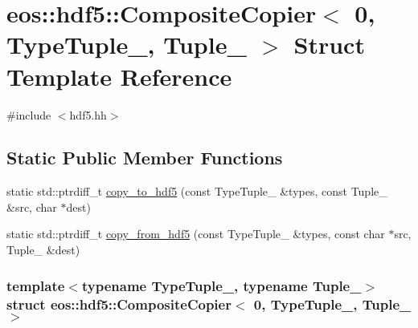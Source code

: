 \hypertarget{structeos_1_1hdf5_1_1CompositeCopier_3_010_00_01TypeTuple___00_01Tuple___01_4}{
\section{eos::hdf5::CompositeCopier$<$ 0, TypeTuple\_\-, Tuple\_\- $>$ Struct Template Reference}
\label{structeos_1_1hdf5_1_1CompositeCopier_3_010_00_01TypeTuple___00_01Tuple___01_4}
}


{\ttfamily \#include $<$hdf5.hh$>$}\subsection*{Static Public Member Functions}
\begin{DoxyCompactItemize}
\item 
static std::ptrdiff\_\-t \hyperlink{structeos_1_1hdf5_1_1CompositeCopier_3_010_00_01TypeTuple___00_01Tuple___01_4_a2f1615908f9dc922402fd137d5c8ee76}{copy\_\-to\_\-hdf5} (const TypeTuple\_\- \&types, const Tuple\_\- \&src, char $\ast$dest)
\item 
static std::ptrdiff\_\-t \hyperlink{structeos_1_1hdf5_1_1CompositeCopier_3_010_00_01TypeTuple___00_01Tuple___01_4_ad4f925fa6486662bc95b459a95ac4c02}{copy\_\-from\_\-hdf5} (const TypeTuple\_\- \&types, const char $\ast$src, Tuple\_\- \&dest)
\end{DoxyCompactItemize}
\subsubsection*{template$<$typename TypeTuple\_\-, typename Tuple\_\-$>$ struct eos::hdf5::CompositeCopier$<$ 0, TypeTuple\_\-, Tuple\_\- $>$}



